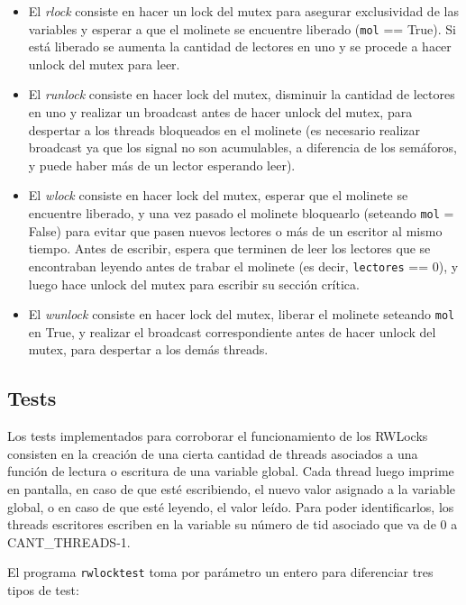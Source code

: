 \begin{itemize}
\item {El \emph{rlock} consiste en hacer un lock del mutex para asegurar exclusividad de las variables y esperar a que el molinete se encuentre liberado (\texttt{mol} == True). Si está liberado se aumenta la cantidad de lectores en uno y se procede a hacer unlock del mutex para leer.}
\item{El \emph{runlock} consiste en hacer lock del mutex, disminuir la cantidad de lectores en uno y realizar un broadcast antes de hacer unlock del mutex, para despertar a los threads bloqueados en el molinete (es necesario realizar broadcast ya que los signal no son acumulables, a diferencia de los semáforos, y puede haber más de un lector esperando leer).}
\item{El \emph{wlock} consiste en hacer lock del mutex, esperar que el molinete se encuentre liberado, y una vez pasado el molinete bloquearlo (seteando \texttt{mol} = False) para evitar que pasen nuevos lectores o más de un escritor al mismo tiempo. Antes de escribir, espera que terminen de leer los lectores que se encontraban leyendo antes de trabar el molinete (es decir, \texttt{lectores} == 0), y luego hace unlock del mutex para escribir su sección crítica.}
\item{El \emph{wunlock} consiste en hacer lock del mutex, liberar el molinete seteando \texttt{mol} en True, y realizar el broadcast correspondiente antes de hacer unlock del mutex, para despertar a los demás threads.}
\end{itemize}


\subsection{Tests}

\par Los tests implementados para corroborar el funcionamiento de los RWLocks consisten en la creación de una cierta cantidad de threads asociados a una función de lectura o escritura de una variable global. Cada thread luego imprime en pantalla, en caso de que esté escribiendo, el nuevo valor asignado a la variable global, o en caso de que esté leyendo, el valor leído. Para poder identificarlos, los threads escritores escriben en la variable su número de tid asociado que va de 0 a CANT\_THREADS-1. 

\par El programa \texttt{rwlocktest} toma por parámetro un entero para diferenciar tres tipos de test:

